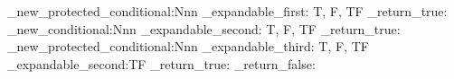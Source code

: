 \prg_new_protected_conditional:Nnn  %
  \example_expandable_first:
  { T, F, TF }
  { \prg_return_true: }
\prg_new_conditional:Nnn
  \example_expandable_second:
  { T, F, TF }
  { \prg_return_true: }
\prg_new_protected_conditional:Nnn  %
  \example_expandable_third:
  { T, F, TF }
  {
    \example_expandable_second:TF
      { \prg_return_true: }
      { \prg_return_false: }
  }
